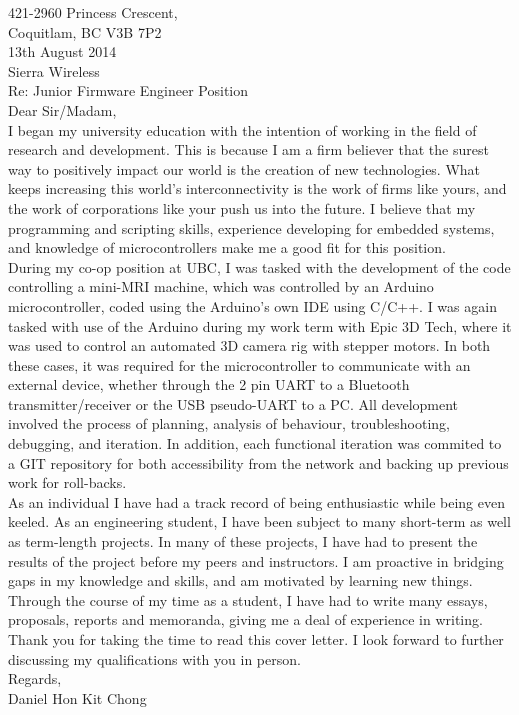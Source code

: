 \documentclass[10pt,a4paper]{article}
\begin{document}
\flushleft
\large
421-2960 Princess Crescent,\\
Coquitlam, BC V3B 7P2 \\
\medskip
13th August 2014 \\
\medskip
Sierra Wireless\\
\medskip
Re: Junior Firmware Engineer Position\\
\medskip
Dear Sir/Madam,\\

\medskip
\hspace{10mm}
I began my university education with the intention of working in the field of research and development. 
This is because I am a firm believer that the surest way to positively impact our world is the creation of new technologies. 
What keeps increasing this world's interconnectivity is the work of firms like yours, and the work of corporations like your push us into the future. 
I believe that my programming and scripting skills, experience developing for embedded systems, and knowledge of microcontrollers 
make me a good fit for this position.\\
\medskip
\hspace{10mm}
During my co-op position at UBC, I was tasked with the development of the code controlling a mini-MRI machine, which was controlled by an Arduino
microcontroller, coded using the Arduino's own IDE using C/C++. I was again tasked with use of the Arduino during my work term with Epic 3D Tech,
where it was used to control an automated 3D camera rig with stepper motors.
In both these cases, it was required for the microcontroller to communicate with an external device, whether through the 2 pin UART to a Bluetooth
transmitter/receiver or the USB pseudo-UART to a PC.
All development involved the process of planning, analysis of behaviour, troubleshooting, debugging, and iteration. 
In addition, each functional iteration was commited to a GIT repository for both accessibility from the network and backing up previous work for roll-backs.
\\
\medskip
\hspace{10mm}
As an individual I have had a track record of being enthusiastic while being even keeled. 
As an engineering student, I have been subject to many short-term as well as term-length projects.
In many of these projects, I have had to present the results of the project before my peers and instructors.
I am proactive in bridging gaps in my knowledge and skills, and am motivated by learning new things.
Through the course of my time as a student, I have had to write many essays, proposals, reports and memoranda, giving me a deal of experience in writing.
Thank you for taking the time to read this cover letter.
I look forward to further discussing my qualifications with you in person.\\


\bigskip
Regards, \\
Daniel Hon Kit Chong
\end{document}
